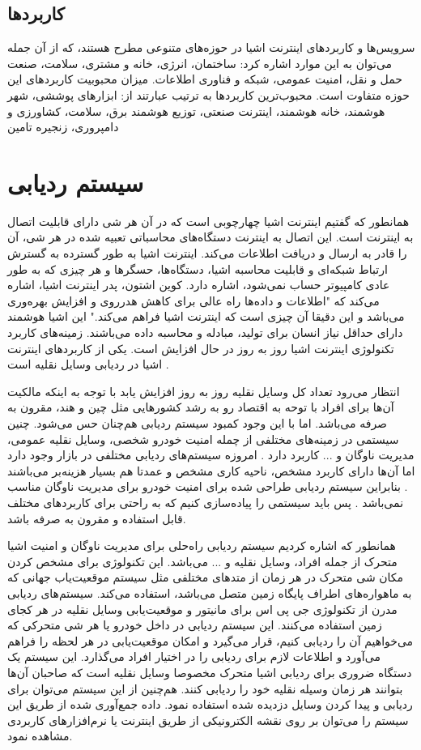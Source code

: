 \subsection{کاربردها}
سرویس‌ها و کاربردهای اینترنت اشیا در حوزه‌های متنوعی مطرح هستند، که از آن جمله می‌توان به این موارد اشاره کرد: ساختمان، انرژی، خانه و مشتری، سلامت، صنعت حمل و نقل، امنیت عمومی، شبكه و فناوری اطلاعات. میزان محبوبیت کاربردهای این حوزه متفاوت است. محبوب‌ترین کاربردها به ترتیب عبارتند از: ابزارهای پوششی، شهر هوشمند، خانه هوشمند، اینترنت صنعتی، توزیع هوشمند برق، سلامت، کشاورزی و دامپروری، زنجیره تامین
\section{سیستم ردیابی}
همانطور که گفتیم اینترنت اشیا چهارچوبی است که در آن هر شی دارای قابلیت اتصال به اینترنت است.
	این اتصال به اینترنت دستگاه‌های محاسباتی تعبیه شده در هر شی، آن را قادر به ارسال و دریافت اطلاعات می‌کند. اینترنت اشیا به طور گسترده به گسترش ارتباط شبکه‌ای و قابلیت محاسبه اشیا، دستگاه‌ها، حسگرها و هر چیزی که به طور عادی کامپیوتر حساب نمی‌شود، اشاره دارد. کوین اشتون، پدر اینترنت اشیا، اشاره می‌کند که "اطلاعات و داده‌ها راه عالی برای کاهش هدرروی و افزایش بهره‌وری می‌باشد و این دقیقا آن چیزی است که اینترنت اشیا فراهم می‌کند." این اشیا هوشمند دارای حداقل نیاز انسان برای تولید، مبادله و محاسبه داده می‌باشند. زمینه‌های کاربرد تکنولوژی اینترنت اشیا روز به روز در حال افزایش است. یکی از کاربردهای اینترنت اشیا در ردیابی وسایل نقلیه است \cite{Mangla2017, Mukhtar2015}.
	
انتظار می‌رود تعداد کل وسایل نقلیه روز به روز افزایش یابد با توجه به اینکه مالکیت آن‌ها برای افراد با توحه به اقتصاد رو به رشد کشورهایی مثل چین و هند، مقرون به صرفه می‌باشد. اما با این وجود کمبود سیستم ردیابی هم‌چنان حس می‌شود. چنین سیستمی در زمینه‌های مختلفی از چمله امنیت خودرو شخصی، وسایل نقلیه عمومی، مدیریت ناوگان و ... کاربرد دارد \cite{Pham2013}. امروزه سیستم‌های ردیابی مختلفی در بازار وجود دارد اما آن‌ها دارای کاربرد مشخص، ناحیه کاری مشخص و عمدتا هم بسیار هزینه‌بر می‌باشند \cite{YoujingCui2003}. بنابراین سیستم ردیابی طراحی شده برای امنیت خودرو برای مدیریت ناوگان مناسب نمی‌باشد \cite{Song2008}. پس باید سیستمی را پیاده‌سازی کنیم که به راحتی برای کاربردهای مختلف قابل استفاده و مقرون به صرفه باشد.


همانطور که اشاره کردیم سیستم ردیابی راه‌حلی برای مدیریت ناوگان و امنیت اشیا متحرک از جمله افراد، وسایل نقلیه و ... می‌باشد. این تکنولوژی برای مشخص کردن مکان شی متحرک در هر زمان از متدهای مختلفی مثل سیستم موقعیت‌یاب جهانی  که به ماهواره‌های اطراف پایگاه زمین متصل می‌باشد، استفاده می‌کند. سیستم‌های ردیابی مدرن از تکنولوژی جی پی اس برای مانیتور و موقعیت‌یابی وسایل نقلیه در هر کجای زمین استفاده می‌کنند. این سیستم ردیابی در داخل خودرو یا هر شی متحرکی که می‌خواهیم آن را ردیابی کنیم، قرار می‌گیرد و امکان موقعیت‌یابی در هر لحظه را فراهم می‌آورد  و اطلاعات لازم برای ردیابی را در اختیار افراد می‌گذارد. این سیستم یک دستگاه ضروری برای ردیابی اشیا متحرک مخصوصا وسایل نقلیه است که صاحبان آن‌ها بتوانند هر زمان وسیله نقلیه خود را ردیابی کنند. هم‌چنین از این سیستم می‌توان برای ردیابی و پیدا کردن وسایل دزدیده شده استفاده نمود. داده جمع‌آوری شده از طریق این سیستم را می‌توان بر روی نقشه الکترونیکی از طریق اینترنت یا نرم‌افزارهای کاربردی مشاهده نمود.


